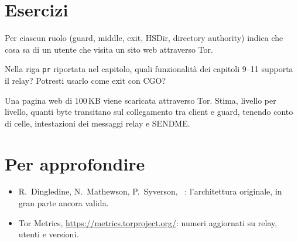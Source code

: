 \section*{Esercizi}

\begin{esercizio}[1]\label{es:06-vista}
Per ciascun ruolo (guard, middle, exit, HSDir, directory authority) indica che cosa sa di un utente che visita un sito web attraverso Tor.
\end{esercizio}

\begin{esercizio}[1]\label{es:06-pr}
Nella riga \texttt{pr} riportata nel capitolo, quali funzionalità dei capitoli 9--11 supporta il relay? Potresti usarlo come exit con CGO?
\end{esercizio}

\begin{esercizio}[2]\label{es:06-livelli}
Una pagina web di 100\,KB viene scaricata attraverso Tor. Stima, livello per livello, quanti byte transitano sul collegamento tra client e guard, tenendo conto di celle, intestazioni dei messaggi relay e SENDME.
\end{esercizio}

\section*{Per approfondire}
\begin{itemize}
  \item R.~Dingledine, N.~Mathewson, P.~Syverson, ~\cite{dingledine2004tor}: l'architettura originale, in gran parte ancora valida.
  \item Tor Metrics, \url{https://metrics.torproject.org/}: numeri aggiornati su relay, utenti e versioni.
\end{itemize}
